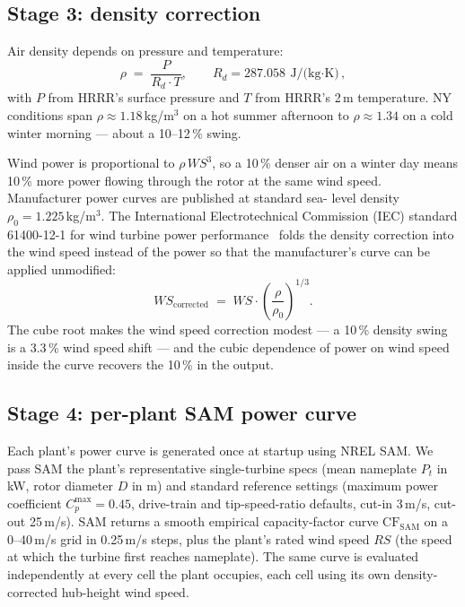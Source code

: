 \documentclass[11pt]{article}
\begin{document}
\subsection{Stage 3: density correction}

Air density depends on pressure and temperature:
\begin{equation}
  \rho \;=\; \frac{P}{R_d \cdot T},
  \qquad R_d = 287.058\ \text{J/(kg$\cdot$K)},
\end{equation}
with $P$ from HRRR's surface pressure and $T$ from HRRR's 2\,m
temperature. NY conditions span $\rho \approx 1.18$\,kg/m$^3$ on a hot
summer afternoon to $\rho \approx 1.34$ on a cold winter morning ---
about a 10--12\,\% swing.

Wind power is proportional to $\rho \, W\!S^3$, so a 10\,\% denser air
on a winter day means 10\,\% more power flowing through the rotor at the
same wind speed. Manufacturer power curves are published at standard sea-
level density $\rho_0 = 1.225$\,kg/m$^3$. The International
Electrotechnical Commission (IEC) standard 61400-12-1 for wind turbine
power performance~\citep{iec614001212017} folds the density correction
into the wind speed instead of the power so
that the manufacturer's curve can be applied unmodified:
\begin{equation}
  W\!S_\text{corrected} \;=\; W\!S \cdot
    \left(\frac{\rho}{\rho_0}\right)^{1/3}.
  \label{eq:density}
\end{equation}
The cube root makes the wind speed correction modest --- a 10\,\% density
swing is a 3.3\,\% wind speed shift --- and the cubic dependence of power
on wind speed inside the curve recovers the 10\,\% in the output.

\subsection{Stage 4: per-plant SAM power curve}

Each plant's power curve is generated once at startup using NREL SAM. We
pass SAM the plant's representative single-turbine specs (mean nameplate
$P_t$ in kW, rotor diameter $D$ in m) and standard reference settings
(maximum power coefficient $C_p^{\max} = 0.45$, drive-train and
tip-speed-ratio defaults, cut-in 3\,m/s, cut-out 25\,m/s). SAM returns a
smooth empirical capacity-factor curve $\mathrm{CF}_\text{SAM}$ on a
0--40\,m/s grid in 0.25\,m/s steps, plus the plant's rated wind speed
$R\!S$ (the speed at which the turbine first reaches nameplate). The same
curve is evaluated independently at every cell the plant occupies, each
cell using its own density-corrected hub-height wind speed.
\end{document}
